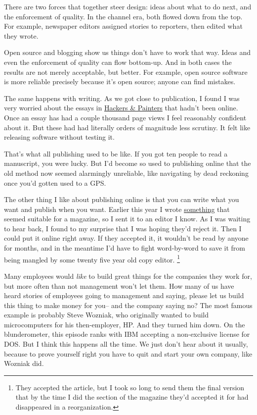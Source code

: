 There are two forces that together steer design: ideas about what to do
next, and the enforcement of quality. In the channel era, both flowed
down from the top. For example, newspaper editors assigned stories to
reporters, then edited what they wrote.

Open source and blogging show us things don't have to work that way.
Ideas and even the enforcement of quality can flow bottom-up. And in
both cases the results are not merely acceptable, but better. For
example, open source software is more reliable precisely because it's
open source; anyone can find mistakes.

The same happens with writing. As we got close to publication, I found I
was very worried about the essays in
\href{http://www.amazon.com/exec/obidos/tg/detail/-/0596006624}{Hackers
\& Painters} that hadn't been online. Once an essay has had a couple
thousand page views I feel reasonably confident about it. But these had
had literally orders of magnitude less scrutiny. It felt like releasing
software without testing it.

That's what all publishing used to be like. If you got ten people to
read a manuscript, you were lucky. But I'd become so used to publishing
online that the old method now seemed alarmingly unreliable, like
navigating by dead reckoning once you'd gotten used to a GPS.

The other thing I like about publishing online is that you can write
what you want and publish when you want. Earlier this year I wrote
\href{inequality.html}{something} that seemed suitable for a magazine,
so I sent it to an editor I know. As I was waiting to hear back, I found
to my surprise that I was hoping they'd reject it. Then I could put it
online right away. If they accepted it, it wouldn't be read by anyone
for months, and in the meantime I'd have to fight word-by-word to save
it from being mangled by some twenty five year old copy editor.
\footnote{They accepted the article, but I took so long to send them the
final version that by the time I did the section of the magazine they'd
accepted it for had disappeared in a reorganization.}

Many employees would \emph{like} to build great things for the companies
they work for, but more often than not management won't let them. How
many of us have heard stories of employees going to management and
saying, please let us build this thing to make money for you-- and the
company saying no? The most famous example is probably Steve Wozniak,
who originally wanted to build microcomputers for his then-employer, HP.
And they turned him down. On the blunderometer, this episode ranks with
IBM accepting a non-exclusive license for DOS. But I think this happens
all the time. We just don't hear about it usually, because to prove
yourself right you have to quit and start your own company, like Wozniak
did.

